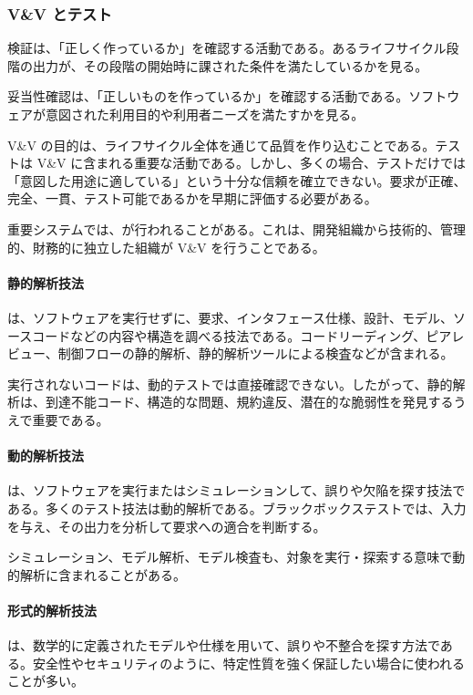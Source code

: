 \subsubsection{V\&V とテスト}
検証は、「正しく作っているか」を確認する活動である。あるライフサイクル段階の出力が、その段階の開始時に課された条件を満たしているかを見る。

妥当性確認は、「正しいものを作っているか」を確認する活動である。ソフトウェアが意図された利用目的や利用者ニーズを満たすかを見る。

V\&V の目的は、ライフサイクル全体を通じて品質を作り込むことである。テストは V\&V に含まれる重要な活動である。しかし、多くの場合、テストだけでは「意図した用途に適している」という十分な信頼を確立できない。要求が正確、完全、一貫、テスト可能であるかを早期に評価する必要がある。

重要システムでは、が行われることがある。これは、開発組織から技術的、管理的、財務的に独立した組織が V\&V を行うことである。

\paragraph{静的解析技法}
は、ソフトウェアを実行せずに、要求、インタフェース仕様、設計、モデル、ソースコードなどの内容や構造を調べる技法である。コードリーディング、ピアレビュー、制御フローの静的解析、静的解析ツールによる検査などが含まれる。

実行されないコードは、動的テストでは直接確認できない。したがって、静的解析は、到達不能コード、構造的な問題、規約違反、潜在的な脆弱性を発見するうえで重要である。

\paragraph{動的解析技法}
は、ソフトウェアを実行またはシミュレーションして、誤りや欠陥を探す技法である。多くのテスト技法は動的解析である。ブラックボックステストでは、入力を与え、その出力を分析して要求への適合を判断する。

シミュレーション、モデル解析、モデル検査も、対象を実行・探索する意味で動的解析に含まれることがある。

\paragraph{形式的解析技法}
は、数学的に定義されたモデルや仕様を用いて、誤りや不整合を探す方法である。安全性やセキュリティのように、特定性質を強く保証したい場合に使われることが多い。

